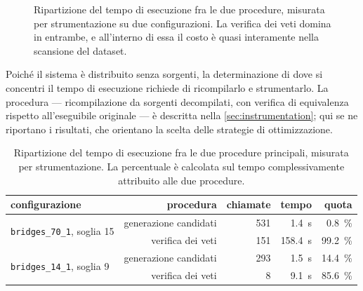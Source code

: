 \begin{figure}[htbp]
\centering
{}
\caption{Ripartizione del tempo di esecuzione fra le due procedure, misurata per strumentazione su
due configurazioni. La verifica dei veti domina in entrambe, e all'interno di essa il costo è
quasi interamente nella scansione del dataset.}
\label{fig:cost}
\end{figure}

Poiché il sistema è distribuito senza sorgenti, la determinazione di dove si concentri il tempo
di esecuzione richiede di ricompilarlo e strumentarlo. La procedura --- ricompilazione da sorgenti
decompilati, con verifica di equivalenza rispetto all'eseguibile originale --- è descritta
nella \autoref{sec:instrumentation}; qui se ne riportano i risultati, che orientano la scelta delle
strategie di ottimizzazione.

\begin{table}[htbp]
\centering
\caption{Ripartizione del tempo di esecuzione fra le due procedure principali, misurata per
strumentazione. La percentuale è calcolata sul tempo complessivamente attribuito alle due
procedure.}
\label{tab:cost}
\footnotesize
\begin{tabular}{lrrrr}
\toprule
configurazione & procedura & chiamate & tempo & quota \\
\midrule
\multirow{2}{*}{\texttt{bridges\_70\_1}, soglia 15}
  & generazione candidati & 531      & \SI{1.4}{\second}   & \SI{0.8}{\percent} \\
  & verifica dei veti     & 151      & \SI{158.4}{\second} & \SI{99.2}{\percent} \\
\midrule
\multirow{2}{*}{\texttt{bridges\_14\_1}, soglia 9}
  & generazione candidati & 293      & \SI{1.5}{\second}   & \SI{14.4}{\percent} \\
  & verifica dei veti     & 8        & \SI{9.1}{\second}   & \SI{85.6}{\percent} \\
\bottomrule
\end{tabular}
\end{table}

